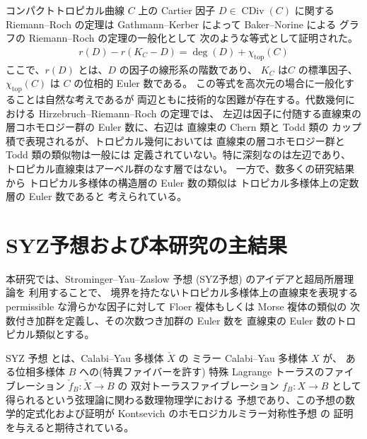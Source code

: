 \documentclass[uplatex,dvipdfmx,12pt]{jsarticle}
\numberwithin{equation}{section}
\theoremstyle{definition}
\newcommand{\opn}[1]{\operatorname{#1}}
\newcommand{\beforesection}{\vspace{-20pt}}
\newcommand{\aftersection}{\vspace{-10pt}}
\begin{document}
コンパクトトロピカル曲線 $C$ 上の Cartier 因子 
$D\in \opn{CDiv}(C)$
に関する Riemann--Roch の定理は
Gathmann--Kerber
\cite{gathmannRiemannRochTheoremTropical2008a} によって 
Baker--Norine \cite{MR2355607}による
グラフの Riemann--Roch の定理の一般化として
次のような等式として証明された。
\begin{align} \label{equation-tropical-rr}
r(D)-r(K_C-D)=\opn{deg}(D)+\chi_{\mathrm{top}}(C)
\end{align}
ここで、$r(D)$ とは、$D$ の因子の線形系の階数であり、
$K_C$ は$C$ の標準因子、$\chi_{\mathrm{top}}(C)$ は
$C$ の位相的 Euler 数である。
この等式を高次元の場合に一般化することは自然な考えであるが
両辺ともに技術的な困難が存在する。代数幾何における
Hirzebruch--Riemann--Roch の定理では、
左辺は因子に付随する直線束の層コホモロジー群の
Euler 数に、右辺は 直線束の Chern 類と Todd 類の
カップ積で表現されるが、トロピカル幾何においては
直線束の層コホモロジー群と Todd 類の類似物は一般には
定義されていない。特に深刻なのは左辺であり、
トロピカル直線束はアーベル群のなす層ではない。
一方で、数多くの研究結果から
トロピカル多様体の構造層の Euler 数の類似は
トロピカル多様体上の定数層の Euler 数であると
考えられている。

\beforesection

\section{SYZ予想および本研究の主結果}

\aftersection

本研究では、Strominger--Yau--Zaslow 予想 (SYZ予想)
のアイデアと超局所層理論\cite{MR1299726}を
利用することで、
境界を持たないトロピカル多様体上の直線束を表現する 
permissible な滑らかな因子に対して
Floer 複体もしくは Morse 複体の類似の
次数付き加群を定義し、その次数つき加群の 
Euler 数を 直線束の Euler 数のトロピカル類似とする。

SYZ 予想\cite{stromingerMirrorSymmetryTduality1996}
とは、Calabi--Yau 多様体 $\check{X}$ の
ミラー Calabi--Yau 多様体 $X$ が、
ある位相多様体 $B$ への(特異ファイバーを許す)
特殊 Lagrange トーラスのファイブレーション
$\check{f}_{B}\colon \check{X}\to B$ の
双対トーラスファイブレーション $f_{B}\colon X\to B$
として得られるという弦理論に関わる数理物理学における
予想であり、この予想の数学的定式化および証明が 
Kontsevich のホモロジカルミラー対称性予想
\cite{MR1403918}の
証明を与えると期待されている。
\end{document}
